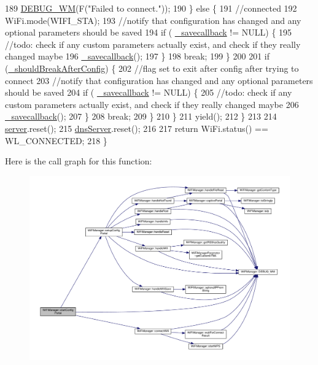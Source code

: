 \begin{DoxyCode}
189         \hyperlink{class_wi_fi_manager_ae5f595c670ccbcf9a191baf50f5c7c26}{DEBUG\_WM}(F(\textcolor{stringliteral}{"Failed to connect."}));
190       \} \textcolor{keywordflow}{else} \{
191         \textcolor{comment}{//connected}
192         WiFi.mode(WIFI\_STA);
193         \textcolor{comment}{//notify that configuration has changed and any optional parameters should be saved}
194         \textcolor{keywordflow}{if} ( \hyperlink{class_wi_fi_manager_a9a316060184788e33e71d88101cb2e0d}{\_savecallback} != NULL) \{
195           \textcolor{comment}{//todo: check if any custom parameters actually exist, and check if they really changed maybe}
196           \hyperlink{class_wi_fi_manager_a9a316060184788e33e71d88101cb2e0d}{\_savecallback}();
197         \}
198         \textcolor{keywordflow}{break};
199       \}
200 
201       \textcolor{keywordflow}{if} (\hyperlink{class_wi_fi_manager_adf42bd3bb7ac538e97407f66e5170858}{\_shouldBreakAfterConfig}) \{
202         \textcolor{comment}{//flag set to exit after config after trying to connect}
203         \textcolor{comment}{//notify that configuration has changed and any optional parameters should be saved}
204         \textcolor{keywordflow}{if} ( \hyperlink{class_wi_fi_manager_a9a316060184788e33e71d88101cb2e0d}{\_savecallback} != NULL) \{
205           \textcolor{comment}{//todo: check if any custom parameters actually exist, and check if they really changed maybe}
206           \hyperlink{class_wi_fi_manager_a9a316060184788e33e71d88101cb2e0d}{\_savecallback}();
207         \}
208         \textcolor{keywordflow}{break};
209       \}
210     \}
211     yield();
212   \}
213 
214   \hyperlink{class_wi_fi_manager_a509523a01c0395cf0dc235b074f2a5ea}{server}.reset();
215   \hyperlink{class_wi_fi_manager_af44ccd00daee619a7bcc89000fa063ca}{dnsServer}.reset();
216 
217   \textcolor{keywordflow}{return}  WiFi.status() == WL\_CONNECTED;
218 \}
\end{DoxyCode}
Here is the call graph for this function\+:\nopagebreak
\begin{figure}[H]
\begin{center}
\leavevmode
\includegraphics[width=350pt]{d4/dc8/class_wi_fi_manager_afaca5021edffb4d9a5bd39f7b0f7a686_cgraph}
\end{center}
\end{figure}
